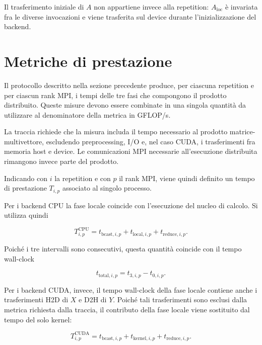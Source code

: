 Il trasferimento iniziale di $A$ non appartiene invece alla repetition:
$A_{\mathrm{loc}}$ è invariata fra le diverse invocazioni e viene trasferita
sul device durante l'inizializzazione del backend.

\section{Metriche di prestazione}\label{sec:metrica-prestazione}\label{sec:metriche}

Il protocollo descritto nella sezione precedente produce, per ciascuna
repetition e per ciascun rank MPI, i tempi delle tre fasi che compongono il
prodotto distribuito. Queste misure devono essere combinate in una singola
quantità da utilizzare al denominatore della metrica in GFLOP/s.

La traccia richiede che la misura includa il tempo necessario al prodotto
matrice-multivettore, escludendo preprocessing, I/O e, nel caso CUDA, i
trasferimenti fra memoria host e device. Le comunicazioni MPI necessarie
all'esecuzione distribuita rimangono invece parte del prodotto.

Indicando con $i$ la repetition e con $p$ il rank MPI, viene quindi definito
un tempo di prestazione $T_{i,p}$ associato al singolo processo.

Per i backend CPU la fase locale coincide con l'esecuzione del nucleo di
calcolo. Si utilizza quindi

\begin{equation}
T^{\mathrm{CPU}}_{i,p}
=
t_{\mathrm{bcast},i,p}
+
t_{\mathrm{local},i,p}
+
t_{\mathrm{reduce},i,p}.
\label{eq:t-performance-cpu}
\end{equation}

Poiché i tre intervalli sono consecutivi, questa quantità coincide con il
tempo wall-clock

\[
t_{\mathrm{total},i,p}
=
t_{3,i,p}-t_{0,i,p}.
\]

Per i backend CUDA, invece, il tempo wall-clock della fase locale contiene
anche i trasferimenti H2D di $X$ e D2H di $Y$. Poiché tali trasferimenti
sono esclusi dalla metrica richiesta dalla traccia, il contributo della
fase locale viene sostituito dal tempo del solo kernel:

\begin{equation}
T^{\mathrm{CUDA}}_{i,p}
=
t_{\mathrm{bcast},i,p}
+
t_{\mathrm{kernel},i,p}
+
t_{\mathrm{reduce},i,p}.
\label{eq:t-performance-cuda}
\end{equation}

